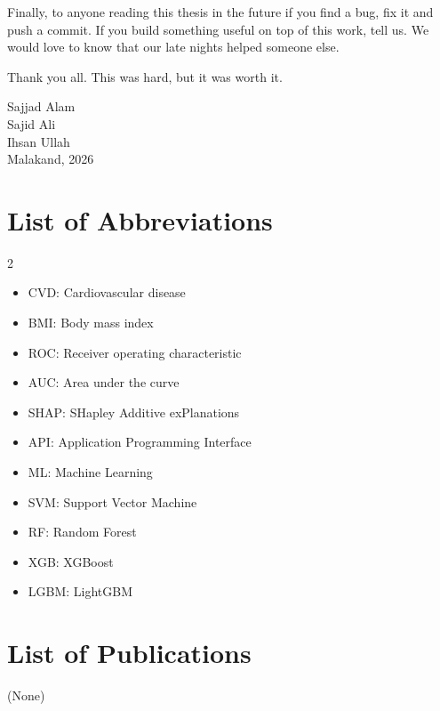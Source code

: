 \documentclass[12pt, a4paper, oneside]{book}
\begin{document}
Finally, to anyone reading this thesis in the future if you find a bug, fix it and push a commit. If you build something useful on top of this work, tell us. We would love to know that our late nights helped someone else.

Thank you all. This was hard, but it was worth it.
\par\bigskip
\begin{flushright}
Sajjad Alam\\
Sajid Ali\\
Ihsan Ullah\\
Malakand, 2026
\end{flushright}

\clearpage
{}
{}
\tableofcontents

\clearpage
{}
{}
\listoffigures

\clearpage
{}
{}
\listoftables

\clearpage
\thispagestyle{plain}
\chapter*{List of Abbreviations}
\begin{multicols}{2}
\begin{itemize}
\item CVD: Cardiovascular disease
\item BMI: Body mass index
\item ROC: Receiver operating characteristic
\item AUC: Area under the curve
\item SHAP: SHapley Additive exPlanations
\item API: Application Programming Interface
\item ML: Machine Learning
\item SVM: Support Vector Machine
\item RF: Random Forest
\item XGB: XGBoost
\item LGBM: LightGBM
\end{itemize}
\end{multicols}

\clearpage
\thispagestyle{plain}
\chapter*{List of Publications}
(None)
\end{document}
